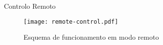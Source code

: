 \begin{frame}{Controlo Remoto}
	\begin{figure}
		\centering
		\texttt{[image: remote-control.pdf]}
		\caption{Esquema de funcionamento em modo remoto}
	\end{figure}
\end{frame}